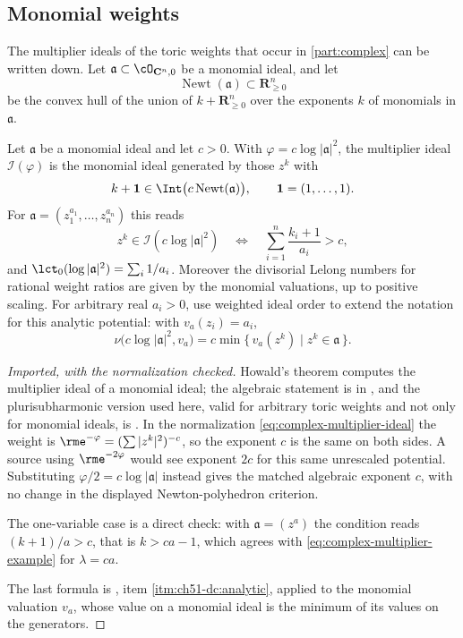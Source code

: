 \subsection{Monomial weights}
\label{sec:ch51-howald}

The multiplier ideals of the toric weights that occur in
\cref{part:complex} can be written down.  Let
$\mathfrak a\subset\cO_{\mathbf C^n,0}$ be a monomial ideal, and let
\[
 \operatorname{Newt}(\mathfrak a)
 \subset\mathbf R^n_{\geq0}
\]
be the convex hull of the union of $k+\mathbf R^n_{\geq0}$ over the
exponents $k$ of monomials in $\mathfrak a$.

\begin{proposition}\label{prop:ch51-howald}
Let $\mathfrak a$ be a monomial ideal and let $c>0$.  With
$\varphi=c\log|\mathfrak a|^2$, the multiplier ideal
$\mathcal I(\varphi)$ is the monomial ideal generated by those $z^k$
with
\[
 k+\mathbf 1\in\Int\bigl(c\operatorname{Newt}(\mathfrak a)\bigr),
 \qquad \mathbf 1=(1,\ldots,1).
\]
For $\mathfrak a=(z_1^{a_1},\ldots,z_n^{a_n})$ this reads
\[
 z^k\in\mathcal I(c\log|\mathfrak a|^2)
 \quad\Longleftrightarrow\quad
 \sum_{i=1}^n\frac{k_i+1}{a_i}>c ,
\]
and $\lct_0(\log|\mathfrak a|^2)=\sum_i1/a_i$.  Moreover the divisorial
Lelong numbers for rational weight ratios are given by the monomial
valuations, up to positive scaling.  For arbitrary real $a_i>0$, use
weighted ideal order to extend the notation for this analytic potential:
with $v_a(z_i)=a_i$,
\[
 \nu\bigl(c\log|\mathfrak a|^2,v_a\bigr)
 =c\min\{\,v_a(z^k)\mid z^k\in\mathfrak a\,\}.
\]
\end{proposition}

\begin{proof}[Imported, with the normalization checked]
Howald's theorem computes the multiplier ideal of a monomial ideal; the
algebraic statement is in \cite{PAG2}, and the plurisubharmonic version
used here, valid for arbitrary toric weights and not only for monomial
ideals, is \cite{Guenancia12}.  In the normalization
\eqref{eq:complex-multiplier-ideal} the weight is
$\rme^{-\varphi}=(\sum|z^{k}|^2)^{-c}$, so the exponent $c$ is the
same on both sides.  A source using $\rme^{-2\varphi}$ would see
exponent $2c$ for this same unrescaled potential.  Substituting
$\varphi/2=c\log|\mathfrak a|$ instead gives the matched algebraic
exponent $c$, with no change in the displayed Newton-polyhedron criterion.

The one-variable case is a direct check: with
$\mathfrak a=(z^{a})$ the condition reads $(k+1)/a>c$, that is
$k>ca-1$, which agrees with
\eqref{eq:complex-multiplier-example} for $\lambda=ca$.

The last formula is , item
\cref{itm:ch51-dc:analytic}, applied to the monomial valuation $v_a$,
whose value on a monomial ideal is the minimum of its values on the
generators.
\end{proof}

